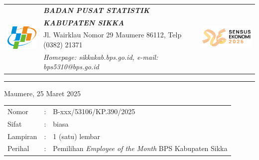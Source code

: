 \documentclass{article}
\begin{document}


\begin{tabular}{llr}
   \multirow{4}{*}{\includegraphics[width=2cm]{logo/bps-logo.png}} %
   &
   \large{\textbf{\textit{BADAN PUSAT STATISTIK}}}
   & \multirow{4}{*}{\includegraphics[width=3.5cm]{logo/se2026/se2026-utama-horizontal-color.png}} \\
   & \large{\textbf{\textit{KABUPATEN SIKKA}}} & \\
   & Jl. Wairklau Nomor 29 Maumere 86112, Telp (0382) 21371 & \\
   & \textit{Homepage: sikkakab.bps.go.id, e-mail: bps5310@bps.go.id} & \\
\end{tabular}

\hfill

\vspace{-1em} %

\rule{\linewidth}{1pt} %


\hfill
Maumere, 25 Maret 2025

\begin{tabular}{@{} lcl}
	Nomor&:&B-xxx/53106/KP.390/2025 \\
	Sifat&:&biasa \\
	Lampiran&:&1 (satu) lembar\\
    Perihal&:& Pemilihan \textit{Employee of the Month} BPS Kabupaten Sikka\\
\end{tabular}

\bigskip %

\end{document}
